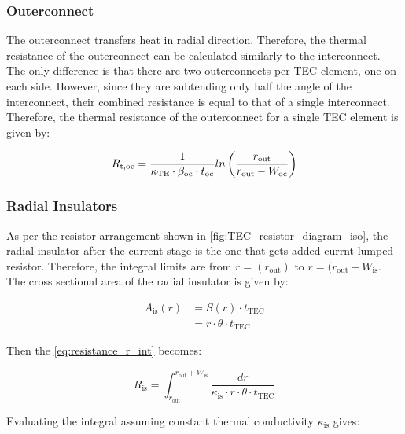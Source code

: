 \documentclass[10pt,a4paper,twocolumn]{article}
\begin{document}
\subsubsection{Outerconnect}

The outerconnect transfers heat in radial direction. Therefore, the thermal resistance of the outerconnect can be calculated similarly to the interconnect. The only difference is that there are two outerconnects per TEC element, one on each side. However, since they are subtending only half the angle of the interconnect, their combined resistance is equal to that of a single interconnect. Therefore, the thermal resistance of the outerconnect for a single TEC element is given by:


\begin{equation}
  R_{\text{t,oc}} = \frac{1}{\kappa_{\text{TE}} \cdot \beta_{\text{oc}} \cdot t_{\text{oc}}} \\ln\left( \frac{r_{\text{out}}}{r_{\text{out}} - W_{\text{oc}}} \right)
\end{equation}

\subsubsection{Radial Insulators}

As per the resistor arrangement shown in \cref{fig:TEC_resistor_diagram_iso}, the radial insulator after the current stage is the one that gets added currnt lumped resistor. Therefore, the integral limits are from $r=(r_{\text{out}})$ to $r=(r_{\text{out}}+W_{\text{is}}$. The cross sectional area of the radial insulator is given by:

\begin{equation*}
  \begin{aligned}
    A_{\text{is}}(r) & = S(r)\cdot t_{\text{TEC}}            \\
                     & = r \cdot \theta \cdot t_{\text{TEC}}
  \end{aligned}
\end{equation*}

Then the \cref{eq:resistance_r_int} becomes:

\begin{equation*}
  R_{\text{is}} = \int_{r_{\text{out}}}^{r_{\text{out}}+W_{\text{is}}} \frac{dr}{\kappa_{\text{is}} \cdot r \cdot \theta \cdot t_{\text{TEC}}}
\end{equation*}

Evaluating the integral assuming constant thermal conductivity $\kappa_{\text{is}}$ gives:
\end{document}
